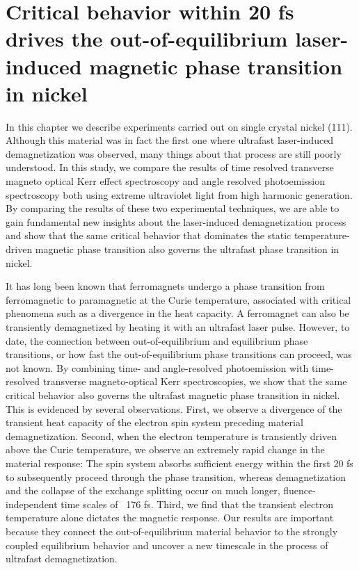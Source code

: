 \chapter{Critical behavior within 20 fs drives the out-of-equilibrium laser-induced magnetic phase transition in nickel}
\label{Critical Behavior}

In this chapter we describe experiments carried out on single crystal nickel (111). Although this material was in fact the first one where ultrafast laser-induced demagnetization was observed, many things about that process are still poorly understood. In this study, we compare the results of time resolved transverse magneto optical Kerr effect spectroscopy and angle resolved photoemission spectroscopy both using extreme ultraviolet light from high harmonic generation. By comparing the results of these two experimental techniques, we are able to gain fundamental new insights about the laser-induced demagnetization process and show that the same critical behavior that dominates the static temperature-driven magnetic phase transition also governs the ultrafast phase transition in nickel.

It has long been known that ferromagnets undergo a phase transition from ferromagnetic to paramagnetic at the Curie temperature, associated with critical phenomena such as a divergence in the heat capacity. A ferromagnet can also be transiently demagnetized by heating it with an ultrafast laser pulse. However, to date, the connection between out-of-equilibrium and equilibrium phase transitions, or how fast the out-of-equilibrium phase transitions can proceed, was not known. By combining time- and angle-resolved photoemission with time-resolved transverse magneto-optical Kerr spectroscopies, we show that the same critical behavior also governs the ultrafast magnetic phase transition in nickel. This is evidenced by several observations. First, we observe a divergence of the transient heat capacity of the electron spin system preceding material demagnetization. Second, when the electron temperature is transiently driven above the Curie temperature, we observe an extremely rapid change in the material response: The spin system absorbs sufficient energy within the first 20 fs to subsequently proceed through the phase transition, whereas demagnetization and the collapse of the exchange splitting occur on much longer, fluence- independent time scales of ~176 fs. Third, we find that the transient electron temperature alone dictates the magnetic response. Our results are important because they connect the out-of-equilibrium material behavior to the strongly coupled equilibrium behavior and uncover a new timescale in the process of ultrafast demagnetization.


